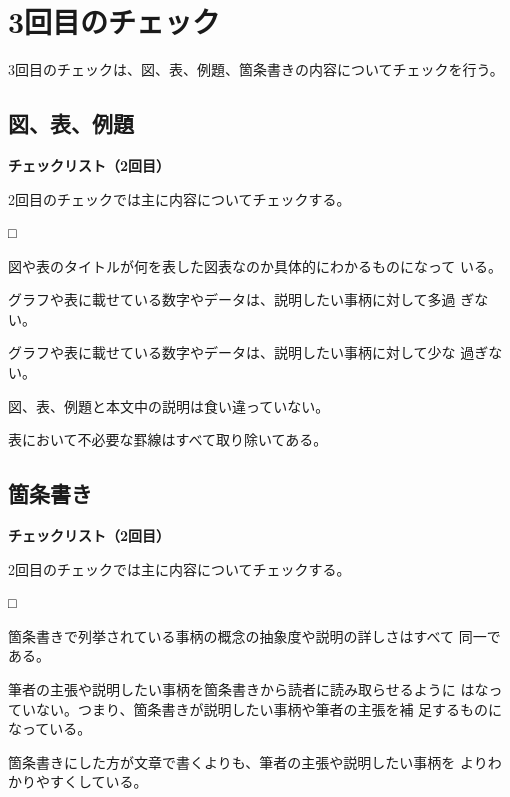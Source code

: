 \documentclass[11pt,a4j]{jsarticle}
\begin{document}
\section{3回目のチェック}

3回目のチェックは、図、表、例題、箇条書きの内容についてチェックを行う。

\subsection{図、表、例題}

\begin{flushleft}
 {\bf チェックリスト（2回目）}
\end{flushleft}
2回目のチェックでは主に内容についてチェックする。
\begin{list}%
 {□} %
 {} %
 \item 図や表のタイトルが何を表した図表なのか具体的にわかるものになって
       いる。
 \item グラフや表に載せている数字やデータは、説明したい事柄に対して多過
       ぎない。
 \item グラフや表に載せている数字やデータは、説明したい事柄に対して少な
       過ぎない。
 \item 図、表、例題と本文中の説明は食い違っていない。
 \item 表において不必要な罫線はすべて取り除いてある。
\end{list}

\subsection{箇条書き}

\begin{flushleft}
 {\bf チェックリスト（2回目）}
\end{flushleft}
2回目のチェックでは主に内容についてチェックする。
\begin{list}%
 {□} %
 {} %
 \item 箇条書きで列挙されている事柄の概念の抽象度や説明の詳しさはすべて
       同一である。
 \item 筆者の主張や説明したい事柄を箇条書きから読者に読み取らせるように
       はなっていない。つまり、箇条書きが説明したい事柄や筆者の主張を補
       足するものになっている。
 \item 箇条書きにした方が文章で書くよりも、筆者の主張や説明したい事柄を
       よりわかりやすくしている。
\end{list}
\end{document}
